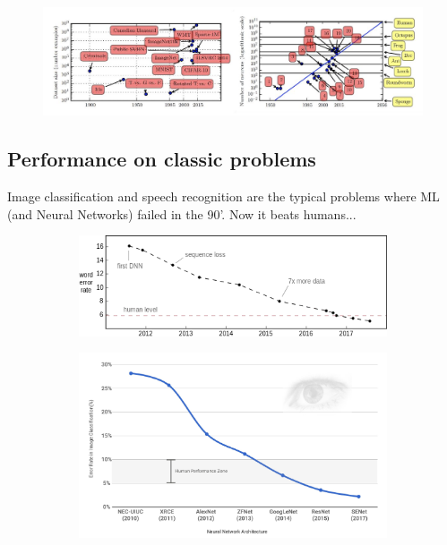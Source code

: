 \begin{figure}[ht]
	\centering
	\includegraphics[width=1\textwidth]{figure_ml/complexity_growth.png}
\end{figure}
\FloatBarrier

\subsection{Performance on classic problems}
Image classification and speech recognition are the typical problems where ML (and Neural Networks) failed in the 90’. Now it beats humans...
\begin{figure}[ht]
	\centering
	\begin{subfigure}{.5\textwidth}
		\centering
		\includegraphics[width=1\linewidth]{figure_ml/speech.png}
	\end{subfigure}%
	\begin{subfigure}{.5\textwidth}
		\centering
		\includegraphics[width=1\linewidth]{figure_ml/img_class.png}
	\end{subfigure}
\end{figure}


